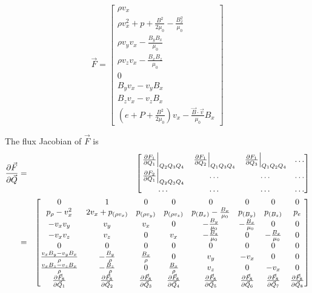 \documentclass[10pt,letterpaper,notitlepage]{report}
\begin{document}
\begin{equation}
\vec F = \begin{bmatrix}
\rho v_x \\
\rho v_x^2 + p + \frac{B^2}{2 \mu_0} - \frac{B_x ^2}{\mu_0} \\
\rho v_y v_x - \frac{B_y B_x}{\mu_0} \\
\rho v_z v_x - \frac{B_x B_z}{\mu_0} \\
0 \\
B_y v_x - v_y B_x \\
B_z v_x - v_z B_x \\
\left( e + P + \frac{B^2}{2 \mu_0} \right) v_x - \frac{\vec B \cdot \vec v}{\mu_0} B_x
\end{bmatrix}
\end{equation}

The flux Jacobian of $\vec F$ is
\begin{eqnarray}
\pdv{\vec F}{\vec Q} & = & \begin{bmatrix} \left. \pdv{F_1}{Q_1} \right|_{Q_2 Q_3 Q_4} & \left. \pdv{F_1}{Q_2} \right|_{Q_1 Q_3 Q_4} & \left. \pdv{F_1}{Q_3} \right|_{Q_1 Q_2 Q_4} & \ldots\\
\left. \pdv{F_2}{Q_1} \right|_{Q_2 Q_3 Q_4} & \ldots & \ldots & \ldots \\
\ldots & \ldots & \ldots & \ldots 
\end{bmatrix} \\
& = & \begin{bmatrix}
0  &  1  &  0  &  0  &  0  &  0  &  0  &  0 \\
p_\rho - v_x ^2 & 2 v_x + p_{(\rho v_x)}  & p_{(\rho v_y)} & p_{(\rho v_z)} & p_{(B_x)} - \frac{B_x}{\mu_0}  & p_{(B_y)} & p_{(B_z)} & p_e \\
-v_x v_y & v_y & v_x & 0 & - \frac{B_y}{\mu_0} & - \frac{B_x}{\mu_0} & 0 & 0 \\
-v_x v_z & v_z & 0 & v_x & - \frac{B_z}{\mu_0} & 0 & - \frac{B_x}{\mu_0} & 0 \\
0 & 0 & 0 & 0 & 0 & 0 & 0 & 0 \\
\frac{v_x B_y - v_y B_x}{\rho} & - \frac{B_y}{\rho} & \frac{B_x}{\rho} & 0 & v_y & - v_x & 0 & 0 \\
\frac{v_x B_z - v_z B_x}{\rho} & - \frac{B_z}{\rho} & 0 & \frac{B_x}{\rho} & v_z & 0 & -v_x & 0 \\
\pdv{\vec F_8}{\vec Q_1} & \pdv{\vec F_8}{\vec Q_2} & \pdv{\vec F_8}{\vec Q_3} & \pdv{\vec F_8}{\vec Q_4} & \pdv{\vec F_8}{\vec Q_5} & \pdv{\vec F_8}{\vec Q_6} & \pdv{\vec F_8}{\vec Q_7} & \pdv{\vec F_8}{\vec Q_8} 
\end{bmatrix}
\end{eqnarray}
\end{document}
